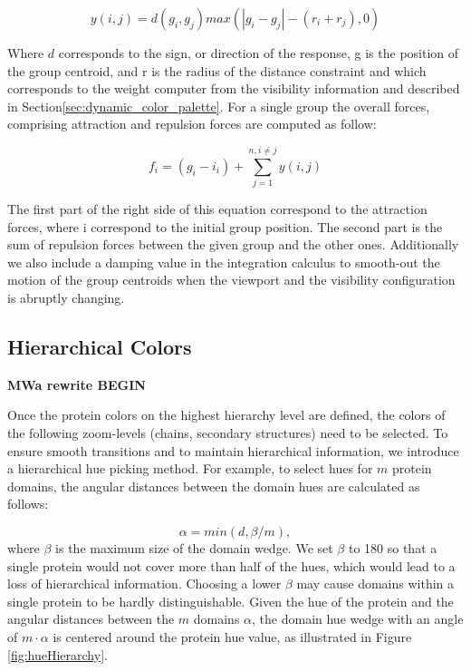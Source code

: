 \documentclass[review,journal]{vgtc}         %
\begin{document}
\begin{equation}
y(i, j) = d(g_{i},g_{j})max(|g_{i} - g_{j}| - (r_{i}+r_{j}), 0)
\end{equation}

Where $d$ corresponds to the sign, or direction of the response, g is the position of the group centroid, and r is the radius of the distance constraint and which corresponds to the weight computer from the visibility information and described in Section\ref{sec:dynamic_color_palette}.
For a single group the overall forces, comprising attraction and repulsion forces are computed as follow:

\begin{equation}
f_{i} = (g_{i} - i_{i}) + \sum_{j=1}^{n, i \neq j} y(i,j)
\end{equation}

The first part of the right side of this equation correspond to the attraction forces, where i correspond to the initial group position.
The second part is the sum of repulsion forces between the given group and the other ones.
Additionally we also include a damping value in the integration calculus to smooth-out the motion of the group centroids when the viewport and the visibility configuration is abruptly changing.

\subsection{Hierarchical Colors}


\textbf{MWa rewrite BEGIN}

Once the protein colors on the highest hierarchy level are defined, the colors of the following zoom-levels (chains, secondary structures) need to be selected. 
To ensure smooth transitions and to maintain hierarchical information, we introduce a hierarchical hue picking method. 
For example, to select hues for $m$ protein domains, the angular distances between the domain hues are calculated as follows: 

	\[
	\alpha = min(d, \beta / m),
\]
where $\beta$ is the maximum size of the domain wedge. 
We set $\beta$ to 180 so that a single protein would not cover more than half of the hues, which would lead to a loss of hierarchical information. 
Choosing a lower $\beta$ may cause domains within a single protein to be hardly distinguishable.  
Given the hue of the protein and the angular distances between the $m$ domains $\alpha$, the domain hue wedge with an angle of $m \cdot \alpha$ is centered around the protein hue value, as illustrated in Figure \ref{fig:hueHierarchy}. 
\end{document}
